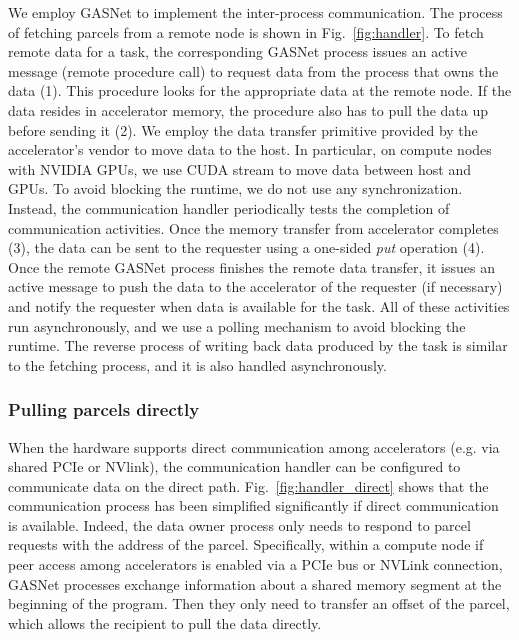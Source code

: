 We employ GASNet to implement the inter-process communication.
The process of fetching parcels from a remote node is shown in Fig.~\ref{fig:handler}.
To fetch remote data for a task, the corresponding GASNet process issues an active message (remote procedure call) to request data from the process that owns the data (1).
This procedure looks for the appropriate data at the remote node.
If the data resides in accelerator memory, the procedure also has to pull the data up before sending it (2).
We employ the data transfer primitive provided by the accelerator's vendor to move data to the host.
In particular, on compute nodes with NVIDIA GPUs, we use CUDA stream to move data between host and GPUs.
To avoid blocking the runtime, we do not use any synchronization.
Instead, the communication handler periodically tests the completion of communication activities.
Once the memory transfer from accelerator completes (3), the data can be sent to the requester using a one-sided {\em put} operation (4).
Once the remote GASNet process finishes the remote data transfer, it issues an active message to push the data to the accelerator of the requester (if necessary) and notify the requester when data is available for the task.
All of these activities run asynchronously, and we use a polling mechanism to avoid blocking the runtime.
The reverse process of writing back data produced by the task is similar to the fetching process, and it is also handled asynchronously.



\subsubsection{Pulling parcels directly}
When the hardware supports direct communication among accelerators (e.g. via shared PCIe or NVlink), the communication handler can be configured to communicate data on the direct path.
Fig.~\ref{fig:handler_direct} shows that the communication process has been simplified significantly if direct communication is available.
Indeed, the data owner process only needs to respond to parcel requests with the address of the parcel.
Specifically, within a compute node if peer access among accelerators is enabled via a PCIe bus or NVLink connection, GASNet processes exchange information about a shared memory segment at the beginning of the program.
Then they only need to transfer an offset of the parcel, which allows the recipient to pull the data directly.


